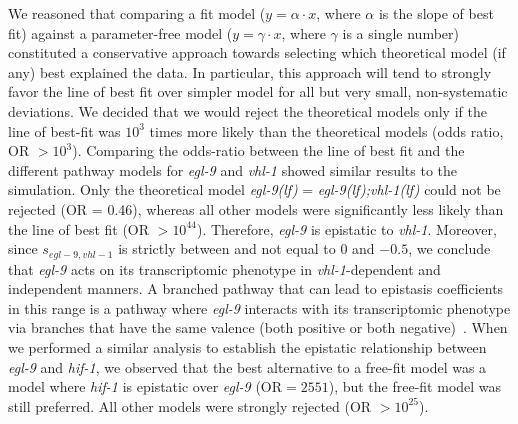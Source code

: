 \documentclass[10pt, onecolumn]{article}
\newcommand{\gene}[1]{\emph{#1}}
\newcommand{\egl}{\emph{\mbox{egl-9}(lf)}}
\newcommand{\eglvhl}{\emph{\mbox{egl-9(lf);vhl-1(lf)}}}
\begin{document}
We reasoned that comparing a fit model ($y = \alpha\cdot x$, where $\alpha$ is
the slope of best fit) against a parameter-free model ($y = \gamma\cdot x$,
where $\gamma$ is a single number) constituted a conservative approach towards
selecting which theoretical model (if any) best explained the data. In particular,
this approach will tend to strongly favor the line of best fit over simpler model
for all but very small, non-systematic deviations. We decided
that we would reject the theoretical models only if the line of best-fit
was $10^3$ times more likely than the theoretical models (odds ratio, OR $>10^3$).
Comparing the odds-ratio between the line of best fit and the different pathway
models for \gene{egl-9} and \gene{vhl-1} showed similar results to the simulation.
Only the theoretical model \egl{} = \eglvhl{} could not be rejected (OR = 0.46),
whereas all other models were significantly less likely than the line of best fit
(OR $>10^{44}$).
Therefore, \gene{egl-9} is epistatic to \gene{vhl-1}. Moreover,
since $s_{egl-9, vhl-1}$ is strictly between and not equal to $0$ and $-0.5$, we
conclude that \gene{egl-9} acts on its transcriptomic phenotype in
\gene{vhl-1}-dependent and independent manners. A branched pathway that can lead
to epistasis coefficients in this range is a pathway where \gene{egl-9} interacts
with its transcriptomic phenotype via branches that have the same valence (both
positive or both negative)~\cite{Shao2009}. When we performed a similar analysis
to establish the epistatic relationship between \gene{egl-9} and \gene{hif-1},
we observed that the best alternative to a free-fit model was a model where
\gene{hif-1} is epistatic over \gene{egl-9} (OR$=2551$), but the free-fit model
was still preferred. All other models were strongly rejected (OR $>10^{25}$).
\end{document}
